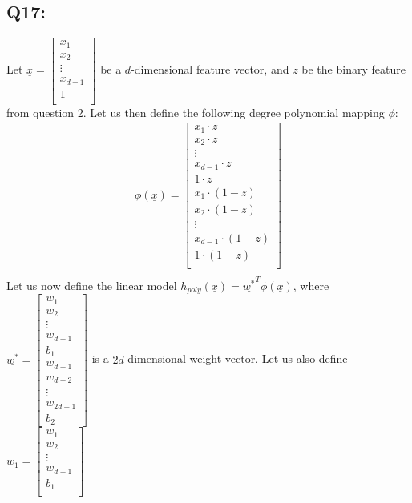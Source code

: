 \documentclass{article}
\begin{document}
\subsection*{Q17:}
    Let $\underline{x}=\begin{bmatrix*}
        x_1 \\  
        x_2 \\  
        \vdots \\
        x_{d-1}\\
        1\\
    \end{bmatrix*}$
    be a $d$-dimensional feature vector, and $z$ be the binary feature from question 2.
    Let us then define the following  degree polynomial mapping $\phi$:
    \begin{align*}
        \phi(\underline{x})=\begin{bmatrix*}
            x_1 \cdot z\\
            x_2 \cdot z\\
            \vdots\\
            x_{d-1} \cdot z\\
            1 \cdot z\\
            x_1 \cdot (1-z)\\
            x_2 \cdot (1-z)\\
            \vdots\\
            x_{d-1} \cdot (1-z)\\
            1 \cdot (1-z)\\
        \end{bmatrix*}\\
    \end{align*}
    Let us now define the linear model $h_{poly}(\underline{x})=\underline{w^*}^T\phi(\underline{x})$, where $\underline{w^*}=\begin{bmatrix*}
        w_1\\
        w_2\\
        \vdots\\
        w_{d-1}\\
        b_1\\
        w_{d+1}\\
        w_{d+2}\\
        \vdots\\
        w_{2d-1}\\
        b_2
    \end{bmatrix*}$
     is a $2d$ dimensional weight vector. Let us also define $\underline{w_1}=\begin{bmatrix*}
        w_1\\
        w_2\\
        \vdots\\
        w_{d-1}\\
        b_1\\
     \end{bmatrix*}$
\end{document}
